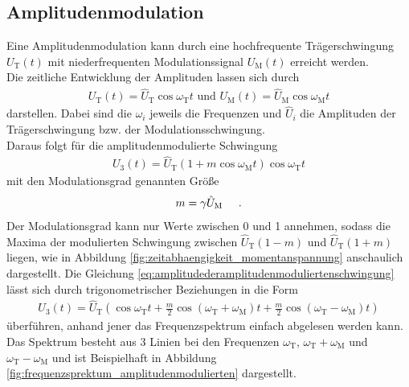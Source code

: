 \documentclass[]{scrartcl}
\begin{document}
\subsection{Amplitudenmodulation}
Eine Amplitudenmodulation kann durch eine hochfrequente Trägerschwingung $U_{\text{T}}\left(t\right)$ mit niederfrequenten Modulationssignal $U_{\text{M}}\left(t\right)$ erreicht werden.\\
Die zeitliche Entwicklung der Amplituden lassen sich durch
\begin{align}
U_{\text{T}}\left(t\right)=\hat{U}_{\text{T}} \cos \omega_{\text{T}}t  \text{ und }U_{\text{M}}\left(t\right)=\hat{U}_{\text{M}} \cos \omega_{\text{M}}t
\end{align}
darstellen. Dabei sind die $\omega_{i}$ jeweils die Frequenzen und $\hat{U}_{i}$ die Amplituden der Trägerschwingung bzw. der Modulationsschwingung.\\
Daraus folgt für die amplitudenmodulierte Schwingung
\begin{align}
U_3\left(t\right)=\hat{U}_{\text{T}} \left(1+m\cos \omega_{\text{M}}t\right)\cos \omega_{\text{T}}t
\label{eq:amplitudederamplitudenmoduliertenschwingung}
\end{align}
mit den Modulationsgrad genannten Größe
\begin{align}
m=\gamma \hat{U}_{\text{M}} \hspace{0.5cm}\text{.}
\end{align}
Der Modulationsgrad kann nur Werte zwischen 0 und 1 annehmen, sodass die Maxima der modulierten Schwingung zwischen $\hat{U}_{\text{T}}\left(1-m\right)$ und $\hat{U}_{\text{T}}\left(1+m\right)$ liegen, wie in Abbildung 
\ref{fig:zeitabhaengigkeit_momentanspannung} anschaulich dargestellt.
Die Gleichung \ref{eq:amplitudederamplitudenmoduliertenschwingung} lässt sich durch trigonometrischer Beziehungen in die Form
\begin{align}
U_3\left(t\right)=\hat{U}_{\text{T}}\left(\cos \omega_{\text{T}}t+ \frac{m}{2}\cos \left( \omega_{\text{T}}+\omega_{\text{M}}\right)t +\frac{m}{2}\cos \left( \omega_{\text{T}}-\omega_{\text{M}}\right)t  \right) 
\label{eq:amplitudederamplitudenmoduliertenschwingungbesser}
\end{align}
überführen, anhand jener das Frequenzspektrum einfach abgelesen werden kann. Das Spektrum besteht aus 3 Linien bei den Frequenzen $\omega_{\text{T}}$, $\omega_{\text{T}}+\omega_{\text{M}}$ und $\omega_{\text{T}}-\omega_{\text{M}}$ und ist Beispielhaft in Abbildung \ref{fig:frequenzsprektum_amplitudenmodulierten} dargestellt.\\
\end{document}
